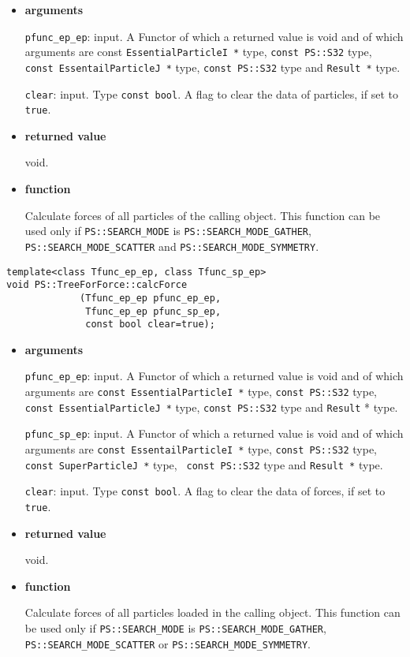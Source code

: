 \begin{itemize}

\item {\bf arguments}

{\tt pfunc\_ep\_ep}: input. A Functor of which a returned value is
void and of which arguments are const {\tt EssentialParticleI *} type, {\tt const PS::S32} type, {\tt const EssentailParticleJ *} type, {\tt const PS::S32} type and {\tt Result *} type.

{\tt clear}: input. Type {\tt const bool}. A flag to clear the data of particles, if set to {\tt true}.


\item {\bf returned value}

void.

\item {\bf function}

Calculate forces of all particles of the calling object. This function can be used only if {\tt PS::SEARCH\_MODE} is {\tt PS::SEARCH\_MODE\_GATHER}, {\tt PS::SEARCH\_MODE\_SCATTER} and {\tt PS::SEARCH\_MODE\_SYMMETRY}.

\end{itemize}

\begin{screen}
\begin{verbatim}
template<class Tfunc_ep_ep, class Tfunc_sp_ep>
void PS::TreeForForce::calcForce
             (Tfunc_ep_ep pfunc_ep_ep,
              Tfunc_ep_ep pfunc_sp_ep,
              const bool clear=true);
\end{verbatim}
\end{screen}

\begin{itemize}

\item {\bf arguments}

{\tt pfunc\_ep\_ep}: input. A Functor of which a returned value is
void and of which arguments are {\tt const EssentialParticleI *} type, {\tt const PS::S32} type, {\tt const EssentialParticleJ *} type, {\tt const PS::S32} type and {\tt Result} * type.

{\tt pfunc\_sp\_ep}: input. A Functor of which a returned value is
void and of which arguments are {\tt const EssentailParticleI *} type,
{\tt const PS::S32} type, {\tt const SuperParticleJ *} type, {\tt
const PS::S32} type and {\tt Result *} type.

{\tt clear}: input. Type {\tt const bool}. A flag to clear the data of forces, if set to {\tt true}.

\item {\bf returned value}

void.

\item {\bf function}

Calculate forces of all particles loaded in the calling object.  This function can be used only if {\tt PS::SEARCH\_MODE} is {\tt PS::SEARCH\_MODE\_GATHER}, {\tt PS::SEARCH\_MODE\_SCATTER} or {\tt PS::SEARCH\_MODE\_SYMMETRY}.

\end{itemize}

